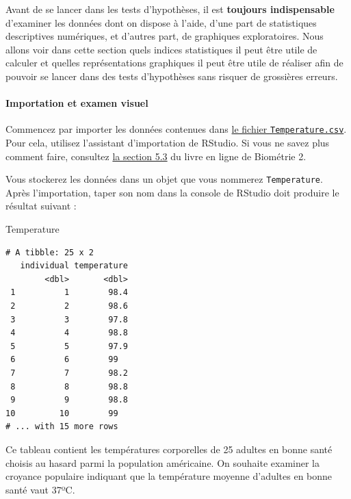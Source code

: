 \documentclass[
  a4paper,
]{article}
\newenvironment{Shaded}{\begin{snugshade}}{\end{snugshade}}
\newcommand{\NormalTok}[1]{\textcolor[rgb]{0.12,0.11,0.11}{#1}}
\begin{document}
Avant de se lancer dans les tests d'hypothèses, il est \textbf{toujours indispensable} d'examiner les données dont on dispose à l'aide, d'une part de statistiques descriptives numériques, et d'autres part, de graphiques exploratoires. Nous allons voir dans cette section quels indices statistiques il peut être utile de calculer et quelles représentations graphiques il peut être utile de réaliser afin de pouvoir se lancer dans des tests d'hypothèses sans risquer de grossières erreurs.

\hypertarget{importation-et-examen-visuel}{%
\paragraph{Importation et examen visuel}\label{importation-et-examen-visuel}}

Commencez par importer les données contenues dans \href{https://besibo.github.io/Biometrie3/data/Temperature.csv}{le fichier \texttt{Temperature.csv}}. Pour cela, utilisez l'assistant d'importation de RStudio. Si vous ne savez plus comment faire, consultez \href{https://besibo.github.io/Biometrie2/tidyr.html\#importer-des-donnees-depuis-un-tableur}{la section 5.3} du livre en ligne de Biométrie 2.

Vous stockerez les données dans un objet que vous nommerez \texttt{Temperature}. Après l'importation, taper son nom dans la console de RStudio doit produire le résultat suivant :

\begin{Shaded}
\begin{Highlighting}[]
\NormalTok{Temperature}
\end{Highlighting}
\end{Shaded}

\begin{verbatim}
# A tibble: 25 x 2
   individual temperature
        <dbl>       <dbl>
 1          1        98.4
 2          2        98.6
 3          3        97.8
 4          4        98.8
 5          5        97.9
 6          6        99  
 7          7        98.2
 8          8        98.8
 9          9        98.8
10         10        99  
# ... with 15 more rows
\end{verbatim}

Ce tableau contient les températures corporelles de 25 adultes en bonne santé choisis au hasard parmi la population américaine. On souhaite examiner la croyance populaire indiquant que la température moyenne d'adultes en bonne santé vaut 37ºC.
\end{document}
